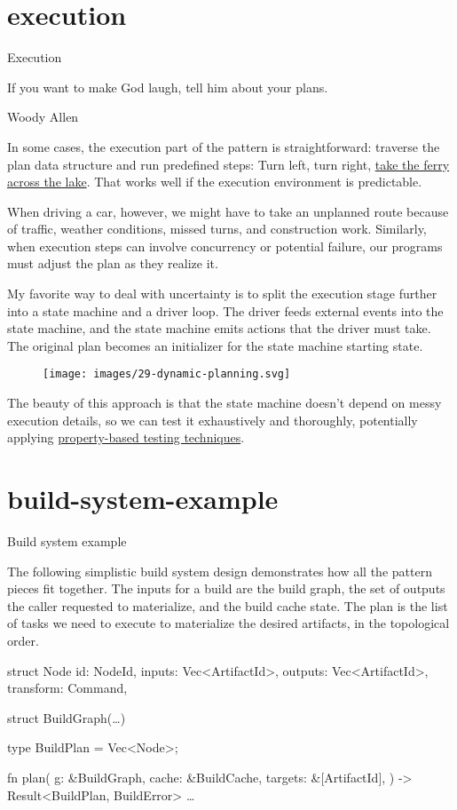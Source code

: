 \documentclass{article}
\begin{document}
\section{execution}{Execution}

\epigraph{If you want to make God laugh, tell him about your plans.}{Woody Allen}

In some cases, the execution part of the pattern is straightforward: traverse the plan data structure and run predefined steps:
Turn left, turn right, \href{https://xkcd.com/461/}{take the ferry across the lake}.
That works well if the execution environment is predictable.

When driving a car, however, we might have to take an unplanned route because of traffic, weather conditions, missed turns, and construction work.
Similarly, when execution steps can involve concurrency or potential failure, our programs must adjust the plan as they realize it.

My favorite way to deal with uncertainty is to split the execution stage further into a state machine and a driver loop.
The driver feeds external events into the state machine, and the state machine emits actions that the driver must take.
The original plan becomes an initializer for the state machine starting state.

\begin{figure}[grayscale-diagram]
\texttt{[image: images/29-dynamic-planning.svg]}
\end{figure}

The beauty of this approach is that the state machine doesn't depend on messy execution details,
so we can test it exhaustively and thoroughly,
potentially applying \href{https://propertesting.com/book_state_machine_properties.html}{property-based testing techniques}.

\section{build-system-example}{Build system example}

The following simplistic build system design demonstrates how all the pattern pieces fit together.
The inputs for a build are the build graph, the set of outputs the caller requested to materialize, and the build cache state.
The plan is the list of tasks we need to execute to materialize the desired artifacts, in the topological order.

\begin{code}[rust]
struct Node {
    id: NodeId,
    inputs: Vec<ArtifactId>,
    outputs: Vec<ArtifactId>,
    transform: Command,
}

struct BuildGraph(\ldots)

type BuildPlan = Vec<Node>;

fn plan(
    g: &BuildGraph,
    cache: &BuildCache,
    targets: &[ArtifactId],
) -> Result<BuildPlan, BuildError> { \ldots  }
\end{code}
\end{document}
